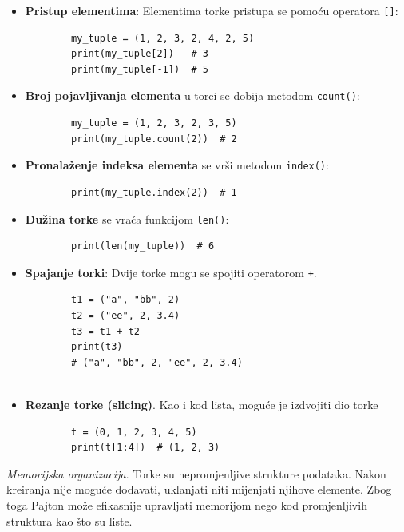 \begin{itemize}
	
	\item \textbf{Pristup elementima}:	Elementima torke pristupa se pomoću operatora \texttt{[]}:
	
	\begin{verbatim}
		my_tuple = (1, 2, 3, 2, 4, 2, 5)
		print(my_tuple[2])   # 3
		print(my_tuple[-1])  # 5
	\end{verbatim}
	
	\item \textbf{Broj pojavljivanja elementa} u torci se dobija metodom \texttt{count()}:
	
	\begin{verbatim}
		my_tuple = (1, 2, 3, 2, 3, 5)
		print(my_tuple.count(2))  # 2
	\end{verbatim}
	
	\item \textbf{Pronalaženje indeksa elementa} se vrši  metodom \texttt{index()}:
	
	\begin{verbatim}
		print(my_tuple.index(2))  # 1
	\end{verbatim}
	
	\item \textbf{Dužina torke} se vraća funkcijom \texttt{len()}:
	\begin{verbatim}
		print(len(my_tuple))  # 6
	\end{verbatim}
	
	\item \textbf{Spajanje torki}: Dvije torke mogu se spojiti operatorom \texttt{+}.
	
	\begin{verbatim}
		t1 = ("a", "bb", 2)
		t2 = ("ee", 2, 3.4)
		t3 = t1 + t2
		print(t3)
		# ("a", "bb", 2, "ee", 2, 3.4)
		
	\end{verbatim}
	
	\item \textbf{Rezanje torke (slicing)}.	Kao i kod lista, moguće je izdvojiti dio torke
	
	\begin{verbatim}
		t = (0, 1, 2, 3, 4, 5)
		print(t[1:4])  # (1, 2, 3)
	\end{verbatim}
	
\end{itemize}

\textit{Memorijska organizacija}. Torke su nepromjenljive strukture podataka. Nakon kreiranja nije moguće dodavati, uklanjati niti mijenjati njihove elemente. Zbog toga Pajton može efikasnije upravljati memorijom nego kod promjenljivih struktura kao što su liste.

